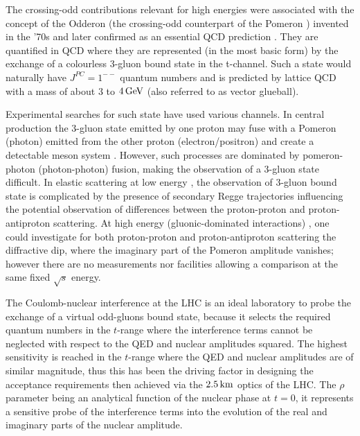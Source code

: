 The crossing-odd contributions relevant for high energies were associated with the concept of the Odderon (the crossing-odd counterpart of the Pomeron \cite{lipatov-1986}) invented in the '70s \cite{nicolescu-1973,nicolescu-1975} and later confirmed as an essential QCD prediction \cite{bartels-1980,kwiecinski-1980,jaroszewicz-1981,braun,ioffe-2010}. They are quantified in QCD \cite{levin-1990,durham-2018} where they are represented (in the most basic form) by the exchange of a colourless 3-gluon bound state in the t-channel. Such a state would naturally have $J^{PC}=1^{--}$ quantum numbers and is predicted by lattice QCD with a mass of about $3$ to $4\,{\rm GeV}$ (also referred to as vector glueball).

Experimental searches for such state have used various channels. In central production the 3-gluon state emitted by one proton may fuse with a Pomeron (photon) emitted from the other proton (electron/positron) and create a detectable meson system \cite{hera-odderon-2002}. However, such processes are dominated by pomeron-photon (photon-photon) fusion, making the observation of a 3-gluon state difficult. In elastic scattering at low energy \cite{breakstone-85}, the observation of 3-gluon bound state is complicated by the presence of secondary Regge trajectories influencing the potential observation of differences between the proton-proton and proton-antiproton scattering. At high energy (gluonic-dominated interactions) \cite{yellow-report}, one could investigate for both proton-proton and proton-antiproton scattering the diffractive dip, where the imaginary part of the Pomeron amplitude vanishes; however there are no measurements nor facilities allowing a comparison at the same fixed $\sqrt s$ energy.

The Coulomb-nuclear interference at the LHC is an ideal laboratory to probe the exchange of a virtual odd-gluons bound state, because it selects the required quantum numbers in the $t$-range where the interference terms cannot be neglected with respect to the QED and nuclear amplitudes squared. The highest sensitivity is reached in the $t$-range where the QED and nuclear amplitudes are of similar magnitude, thus this has been the driving factor in designing the acceptance requirements then achieved via the $2.5\,{\rm km}$ optics of the LHC. The $\rho$ parameter being an analytical function of the nuclear phase at $t=0$, it represents a sensitive probe of the interference terms into the evolution of the real and imaginary parts of the nuclear amplitude.

